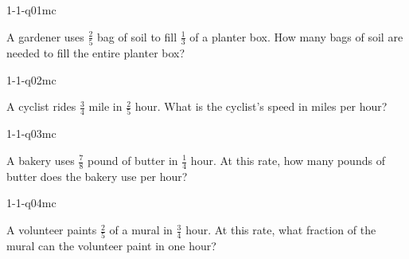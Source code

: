 

\begin{practiceQuestion}{1-1-q01}{mc}
\begin{questionText}
A gardener uses $\frac{2}{5}$ bag of soil to fill $\frac{1}{3}$ of a planter box. How many bags of soil are needed to fill the entire planter box?
\end{questionText}
\end{practiceQuestion}

\begin{practiceQuestion}{1-1-q02}{mc}
\begin{questionText}
A cyclist rides $\frac{3}{4}$ mile in $\frac{2}{5}$ hour. What is the cyclist's speed in miles per hour?
\end{questionText}
\end{practiceQuestion}

\begin{practiceQuestion}{1-1-q03}{mc}
\begin{questionText}
A bakery uses $\frac{7}{8}$ pound of butter in $\frac{1}{4}$ hour. At this rate, how many pounds of butter does the bakery use per hour?
\end{questionText}
\end{practiceQuestion}

\begin{practiceQuestion}{1-1-q04}{mc}
\begin{questionText}
A volunteer paints $\frac{2}{5}$ of a mural in $\frac{3}{4}$ hour. At this rate, what fraction of the mural can the volunteer paint in one hour?
\end{questionText}
\end{practiceQuestion}

